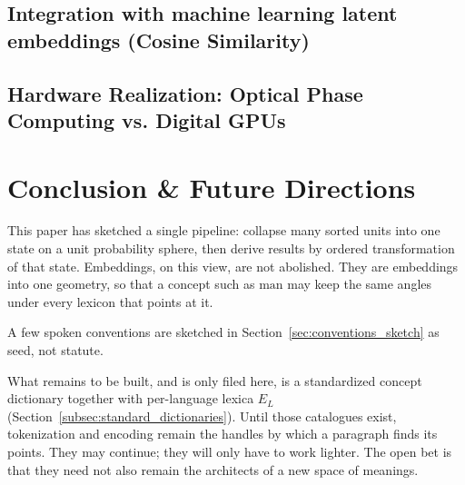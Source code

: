 \documentclass[12pt, a4paper]{article}
\begin{document}
\subsection{Integration with machine learning latent embeddings (Cosine Similarity)}
\subsection{Hardware Realization: Optical Phase Computing vs. Digital GPUs}

\section{Conclusion \& Future Directions}

This paper has sketched a single pipeline: collapse many sorted units
into one state on a unit probability sphere, then derive results by
ordered transformation of that state. Embeddings, on this view, are
not abolished. They are embeddings into one geometry, so that a
concept such as $\mathrm{man}$ may keep the same angles under every
lexicon that points at it.

A few spoken conventions are sketched in
Section~\ref{sec:conventions_sketch} as seed, not statute.

What remains to be built, and is only filed here, is a standardized
concept dictionary together with per-language lexica $E_L$
(Section~\ref{subsec:standard_dictionaries}). Until those catalogues
exist, tokenization and encoding remain the handles by which a
paragraph finds its points. They may continue; they will only have to
work lighter. The open bet is that they need not also
remain the architects of a new space of meanings.
\end{document}
